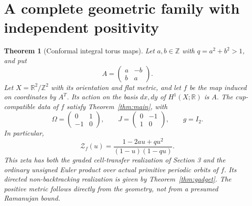 \documentclass[11pt,a4paper]{article}
\newtheorem{theorem}[definition]{Theorem}
\theoremstyle{remark}\newtheorem{remark}[definition]{Remark}
\newcommand{\R}{\mathbb R}\newcommand{\C}{\mathbb C}\newcommand{\Z}{\mathbb Z}
\begin{document}
\section{A complete geometric family with independent positivity}\label{sec:torus}

\begin{theorem}[Conformal integral torus maps]\label{thm:torus}
Let $a,b\in\Z$ with $q=a^2+b^2>1$, and put
\[
A=\begin{pmatrix}a&-b\\b&a\end{pmatrix}.
\]
Let $X=\R^2/\Z^2$ with its orientation and flat metric, and let $f$ be the map induced on coordinates by $A^T$. Its action on the basis $dx,dy$ of $H^1(X;\R)$ is $A$. The cup-compatible data of $f$ satisfy Theorem~\ref{thm:main}, with
\[
\Omega=\begin{pmatrix}0&1\\-1&0\end{pmatrix},\qquad
J=\begin{pmatrix}0&-1\\1&0\end{pmatrix},\qquad g=I_2.
\]
In particular,
\[
\mathcal Z_f(u)=\frac{1-2au+qu^2}{(1-u)(1-qu)}.\tag{7.1}
\]
This zeta has \emph{both} the graded cell-transfer realization of Section 3 and the ordinary unsigned Euler product over actual primitive periodic orbits of $f$. Its directed non-backtracking realization is given by Theorem~\ref{thm:gadget}. The positive metric follows directly from the geometry, not from a presumed Ramanujan bound.
\end{theorem}
\end{document}
